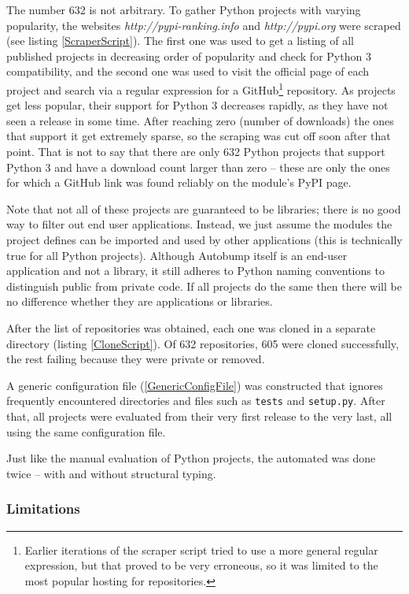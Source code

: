 \documentclass{l4proj}
\newcommand\genericstyle{\lstset{basicstyle=\ttm}}
\newcommand\codeinline[1]{{\genericstyle\lstinline!#1!}}
\begin{document}
The number 632 is not arbitrary. To gather Python projects with
varying popularity, the websites \textit{http://pypi-ranking.info} and
\textit{http://pypi.org} were scraped (see listing
\ref{ScraperScript}). The first one was used to get a listing of all
published projects in decreasing order of popularity and check for
Python 3 compatibility, and the second one was used to visit the
official page of each project and search via a regular expression for
a GitHub\footnote{Earlier iterations of the scraper script tried to
use a more general regular expression, but that proved to be very
erroneous, so it was limited to the most popular hosting for
repositories.} repository. As projects get less popular, their support
for Python 3 decreases rapidly, as they have not seen a release in
some time. After reaching zero (number of downloads) the ones that
support it get extremely sparse, so the scraping was cut off soon
after that point. That is not to say that there are only 632 Python
projects that support Python 3 and have a download count larger than
zero -- these are only the ones for which a GitHub link was found
reliably on the module's PyPI page.

Note that not all of these projects are guaranteed to be libraries;
there is no good way to filter out end user applications. Instead, we
just assume the modules the project defines can be imported and used
by other applications (this is technically true for all Python
projects). Although Autobump itself is an end-user application and not
a library, it still adheres to Python naming conventions to
distinguish public from private code. If all projects do the same then
there will be no difference whether they are applications or
libraries.

After the list of repositories was obtained, each one was cloned in a
separate directory (listing \ref{CloneScript}). Of 632 repositories,
605 were cloned successfully, the rest failing because they were
private or removed.

A generic configuration file (\ref{GenericConfigFile}) was constructed
that ignores frequently encountered directories and files such as
\codeinline{tests} and \codeinline{setup.py}. After that, all projects
were evaluated from their very first release to the very last, all
using the same configuration file.

Just like the manual evaluation of Python projects, the automated was
done twice -- with and without structural typing.

\subsubsection{Limitations}
\end{document}
